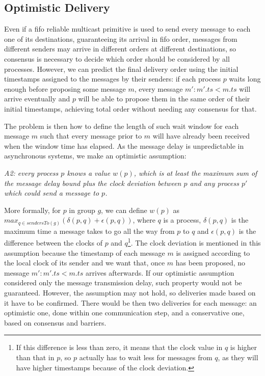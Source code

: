 \documentclass[times, 10pt]{article}
\begin{document}
\subsection{Optimistic Delivery}
\label{sec:optdel}

Even if a fifo reliable multicast primitive is used to send every message to each one of its destinations, guaranteeing its arrival in fifo order, messages from different senders may arrive in different orders at different destinations, so consensus is necessary to decide which order should be considered by all processes. However, we can predict the final delivery order using the initial timestamps assigned to the messages by their senders: if each process $p$ waits long enough before proposing some message $m$, every message $m' : m'.ts < m.ts$ will arrive eventually and $p$ will be able to propose them in the same order of their initial timestamps, achieving total order without needing any consensus for that.

The problem is then how to define the length of such wait window for each message $m$ such that every message prior to $m$ will have already been received when the window time has elapsed. As the message delay is unpredictable in asynchronous systems, we make an optimistic assumption:

\begin{center}
\emph{A2: every process $p$ knows a value $w(p)$, which is at least the maximum sum of the message delay bound plus the clock deviation between $p$ and any process $p'$ which could send a message to $p$.}
\end{center}

More formally, for $p$ in group $g$, we can define $w(p)$ as $max_{q \in sendersTo(g)}(\delta(p,q)+\epsilon(p,q))$, where $q$ is a process, $\delta(p,q)$ is the maximum time a message takes to go all the way from $p$ to $q$ and $\epsilon(p,q)$ is the difference between the clocks of $p$ and $q$\footnote{If this difference is less than zero, it means that the clock value in $q$ is higher than that in $p$, so $p$ actually has to wait less for messages from $q$, as they will have higher timestamps because of the clock deviation.}. The clock deviation is mentioned in this assumption because the timestamp of each message $m$ is assigned according to the local clock of its sender and we want that, once $m$ has been proposed, no message $m' : m'.ts < m.ts$ arrives afterwards. If our optimistic assumption considered only the message transmission delay, such property would not be guaranteed. However, the assumption may not hold, so deliveries made based on it have to be confirmed. There would be then two deliveries for each message: an optimistic one, done within one communication step, and a conservative one, based on consensus and barriers. 
\end{document}
